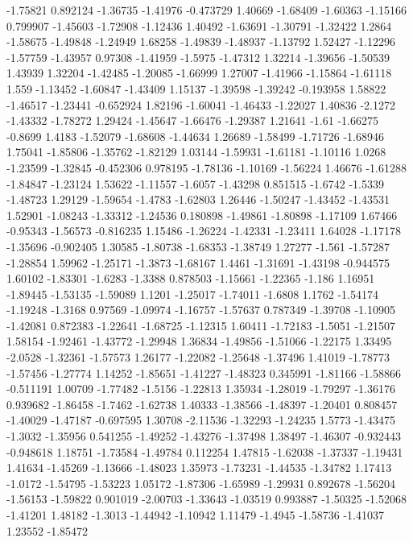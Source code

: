 \documentclass[9pt]{article}
\theoremstyle{plain}
\theoremstyle{definition}
\theoremstyle{remark}
\numberwithin{equation}{section}
\begin{document}
-1.75821
0.892124
-1.36735
-1.41976
-0.473729
1.40669
-1.68409
-1.60363
-1.15166
0.799907
-1.45603
-1.72908
-1.12436
1.40492
-1.63691
-1.30791
-1.32422
1.2864
-1.58675
-1.49848
-1.24949
1.68258
-1.49839
-1.48937
-1.13792
1.52427
-1.12296
-1.57759
-1.43957
0.97308
-1.41959
-1.5975
-1.47312
1.32214
-1.39656
-1.50539
1.43939
1.32204
-1.42485
-1.20085
-1.66999
1.27007
-1.41966
-1.15864
-1.61118
1.559
-1.13452
-1.60847
-1.43409
1.15137
-1.39598
-1.39242
-0.193958
1.58822
-1.46517
-1.23441
-0.652924
1.82196
-1.60041
-1.46433
-1.22027
1.40836
-2.1272
-1.43332
-1.78272
1.29424
-1.45647
-1.66476
-1.29387
1.21641
-1.61
-1.66275
-0.8699
1.4183
-1.52079
-1.68608
-1.44634
1.26689
-1.58499
-1.71726
-1.68946
1.75041
-1.85806
-1.35762
-1.82129
1.03144
-1.59931
-1.61181
-1.10116
1.0268
-1.23599
-1.32845
-0.452306
0.978195
-1.78136
-1.10169
-1.56224
1.46676
-1.61288
-1.84847
-1.23124
1.53622
-1.11557
-1.6057
-1.43298
0.851515
-1.6742
-1.5339
-1.48723
1.29129
-1.59654
-1.4783
-1.62803
1.26446
-1.50247
-1.43452
-1.43531
1.52901
-1.08243
-1.33312
-1.24536
0.180898
-1.49861
-1.80898
-1.17109
1.67466
-0.95343
-1.56573
-0.816235
1.15486
-1.26224
-1.42331
-1.23411
1.64028
-1.17178
-1.35696
-0.902405
1.30585
-1.80738
-1.68353
-1.38749
1.27277
-1.561
-1.57287
-1.28854
1.59962
-1.25171
-1.3873
-1.68167
1.4461
-1.31691
-1.43198
-0.944575
1.60102
-1.83301
-1.6283
-1.3388
0.878503
-1.15661
-1.22365
-1.186
1.16951
-1.89445
-1.53135
-1.59089
1.1201
-1.25017
-1.74011
-1.6808
1.1762
-1.54174
-1.19248
-1.3168
0.97569
-1.09974
-1.16757
-1.57637
0.787349
-1.39708
-1.10905
-1.42081
0.872383
-1.22641
-1.68725
-1.12315
1.60411
-1.72183
-1.5051
-1.21507
1.58154
-1.92461
-1.43772
-1.29948
1.36834
-1.49856
-1.51066
-1.22175
1.33495
-2.0528
-1.32361
-1.57573
1.26177
-1.22082
-1.25648
-1.37496
1.41019
-1.78773
-1.57456
-1.27774
1.14252
-1.85651
-1.41227
-1.48323
0.345991
-1.81166
-1.58866
-0.511191
1.00709
-1.77482
-1.5156
-1.22813
1.35934
-1.28019
-1.79297
-1.36176
0.939682
-1.86458
-1.7462
-1.62738
1.40333
-1.38566
-1.48397
-1.20401
0.808457
-1.40029
-1.47187
-0.697595
1.30708
-2.11536
-1.32293
-1.24235
1.5773
-1.43475
-1.3032
-1.35956
0.541255
-1.49252
-1.43276
-1.37498
1.38497
-1.46307
-0.932443
-0.948618
1.18751
-1.73584
-1.49784
0.112254
1.47815
-1.62038
-1.37337
-1.19431
1.41634
-1.45269
-1.13666
-1.48023
1.35973
-1.73231
-1.44535
-1.34782
1.17413
-1.0172
-1.54795
-1.53223
1.05172
-1.87306
-1.65989
-1.29931
0.892678
-1.56204
-1.56153
-1.59822
0.901019
-2.00703
-1.33643
-1.03519
0.993887
-1.50325
-1.52068
-1.41201
1.48182
-1.3013
-1.44942
-1.10942
1.11479
-1.4945
-1.58736
-1.41037
1.23552
-1.85472
\end{document}

